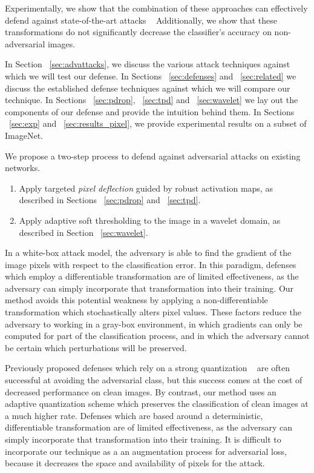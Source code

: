 Experimentally, we show that the combination of these approaches can effectively defend against state-of-the-art attacks ~\cite{Szegedy2013IntriguingPO, Goodfellow2014ExplainingAH,Carlini2017TowardsET,MoosaviDezfooli2016DeepFoolAS,papernot2016limitations,Kurakin2016AdversarialEI}
Additionally, we show that these transformations do not significantly decrease the classifier's accuracy on non-adversarial images.

In Section ~\ref{sec:advattacks}, we discuss the various attack techniques against which we will test our defense.  In Sections ~\ref{sec:defenses} and ~\ref{sec:related} we discuss the established defense techniques against which we will compare our technique.  In Sections ~\ref{sec:pdrop}, ~\ref{sec:tpd} and ~\ref{sec:wavelet} we lay out the components of our defense and provide the intuition behind them.  In Sections ~\ref{sec:exp} and ~\ref{sec:results_pixel}, we provide experimental results on a subset of ImageNet.




We propose a two-step process to defend against adversarial attacks on existing networks.

\begin{enumerate}
\item Apply targeted \textit{pixel deflection} guided by robust activation maps, as described in Sections ~\ref{sec:pdrop} and ~\ref{sec:tpd}.
\item Apply adaptive soft thresholding to the image in a wavelet domain, as described in Section ~\ref{sec:wavelet}.
\end{enumerate}

In a white-box attack model, the adversary is able to find the gradient of the image pixels with respect to the classification error.  
In this paradigm, defenses which employ a differentiable transformation are of limited effectiveness, as the adversary can simply incorporate that transformation into their training.
Our method avoids this potential weakness by applying a non-differentiable transformation which stochastically alters pixel values.
These factors reduce the adversary to working in a gray-box environment, in which gradients can only be computed for part of the classification process, and in which the adversary cannot be certain which perturbations will be preserved.

Previously proposed defenses which rely on a strong quantization ~\cite{Dziugaite2016ASO,Das2017KeepingTB} are often successful at avoiding the adversarial class, but this success comes at the cost of decreased performance on clean images.
By contrast, our method uses an adaptive quantization scheme which preserves the classification of clean images at a much higher rate.
Defenses which are based around a deterministic, differentiable transformation are of limited effectiveness, as the adversary can simply incorporate that transformation into their training.
It is difficult to incorporate our technique as a an augmentation process for adversarial loss, because it decreases the space and availability of pixels for the attack.



